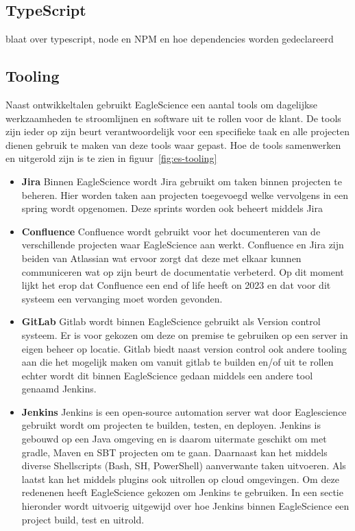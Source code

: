 \subsection{TypeScript}\label{subsec:typescript}
blaat over typescript, node en NPM en hoe dependencies worden gedeclareerd

\subsection{Tooling}\label{subsec:tooling}
Naast ontwikkeltalen gebruikt EagleScience een aantal tools om dagelijkse werkzaamheden te stroomlijnen en software uit te rollen voor de klant. De tools zijn ieder op zijn beurt verantwoordelijk voor een specifieke taak en alle projecten dienen gebruik te maken van deze tools waar gepast. Hoe de tools samenwerken en uitgerold zijn is te zien in figuur~\ref{fig:es-tooling}

\begin{itemize}
    \item \textbf{Jira} Binnen EagleScience wordt Jira gebruikt om taken binnen projecten te beheren. Hier worden taken aan projecten toegevoegd welke vervolgens in een spring wordt opgenomen. Deze sprints worden ook beheert middels Jira
    \item \textbf{Confluence}
    Confluence wordt gebruikt voor het documenteren van de verschillende projecten waar EagleScience aan werkt. Confluence en Jira zijn beiden van Atlassian wat ervoor zorgt dat deze met elkaar kunnen communiceren wat op zijn beurt de documentatie verbeterd. Op dit moment lijkt het erop dat Confluence een end of life heeft on 2023 en dat voor dit systeem een vervanging moet worden gevonden.
    \item \textbf{GitLab}
    Gitlab wordt binnen EagleScience gebruikt als Version control systeem. Er is voor gekozen om deze on premise te gebruiken op een server in eigen beheer op locatie. Gitlab biedt naast version control ook andere tooling aan die het mogelijk maken om vanuit gitlab te builden en/of uit te rollen echter wordt dit binnen EagleScience gedaan middels een andere tool genaamd Jenkins.
    \item \textbf{Jenkins}
    Jenkins is een open-source automation server wat door Eaglescience gebruikt wordt om projecten te builden, testen, en deployen. Jenkins is gebouwd op een Java omgeving en is daarom uitermate geschikt om met gradle, Maven en SBT projecten om te gaan. Daarnaast kan het middels diverse Shellscripts (Bash, SH, PowerShell) aanverwante taken uitvoeren. Als laatst kan het middels plugins ook uitrollen op cloud omgevingen. Om deze redenenen heeft EagleScience gekozen om Jenkins te gebruiken. In een sectie hieronder wordt uitvoerig uitgewijd over hoe Jenkins binnen EagleScience een project build, test en uitrold.
\end{itemize}


